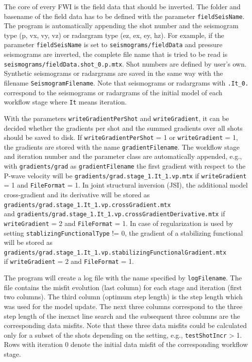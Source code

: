 \documentclass[pdftex,a4paper,parskip,listof=totoc,bibliography=totoc,onehalfspacing,12pt]{scrreprt}
\begin{document}
The core of every FWI is the field data that should be inverted. The folder and basename of the field data has to be defined with the parameter \verb+fieldSeisName+. The program is automatically appending the shot number and the seismogram type (p, vx, vy, vz) or radargram type (ez, ex, ey, hz). For example, if the parameter \verb+fieldSeisName+ is set to \verb+seismograms/fieldData+ and pressure seismograms are inverted, the complete file name that is tried to be read is \verb+seismograms/fieldData.shot_0.p.mtx+. Shot numbers are defined by user's own. Synthetic seismograms or radargrams are saved in the same way with the filename \verb+SeismogramFilename+. Note that seismograms or radargrams with \verb+.It_0.+ correspond to the seismograms or radargrams of the initial model of each workflow stage where \verb+It+ means iteration.

With the parameters \verb+writeGradientPerShot+ and \verb+writeGradient+, it can be decided whether the gradients per shot and the summed gradients over all shots should be saved to disk. If \verb+writeGradientPerShot+ = 1 or \verb+writeGradient+ = 1, the gradients are stored with the name \verb+gradientFilename+. The workflow stage and iteration number and the parameter class are automatically appended, e.g., with \verb+gradients/grad+ as \verb+gradientFilename+ the first gradient with respect to the P-wave velocity will be \verb+gradients/grad.stage_1.It_1.vp.mtx+ if \verb+writeGradient+ = 1 and \verb+FileFormat+ = 1. In joint structural inversion (JSI), the additional model cross-gradient and its derivative will be stored as \verb+gradients/grad.stage_1.It_1.vp.crossGradient.mtx+\\
and \verb+gradients/grad.stage_1.It_1.vp.crossGradientDerivative.mtx+ if \verb+writeGradient+ = 2 and \verb+FileFormat+ = 1. In case of regularization is used by setting \verb+stablizingFunctionalType+ != 0, the gradient of a stabilizing functional will be stored as\\ \verb+gradients/grad.stage_1.It_1.vp.stabilizingFunctionalGradient.mtx+\\ if \verb+writeGradient+ = 2 and \verb+FileFormat+ = 1.

The program will create a log file with the name specified by \verb+logFilename+. The file contains the misfit evolution (last column) for each stage and iteration (first two columns). The third column (optimum step length) is the step length which was used for the model update. The next three columns correspond to the three step length of the inexact line search and the subsequent three columns are the corresponding data misfits. Note that these three data misfits could be calculated only for a subset of the shots depending on the setting, e.g., \verb+testShotIncr+ > 1. Rows with iteration 0 denote the initial data misfit of the corresponding workflow stage.
\end{document}
